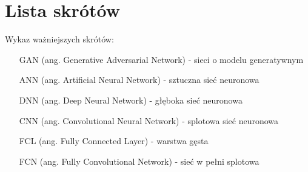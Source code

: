 \section*{Lista skrótów} %

  \bigskip
  Wykaz ważniejszych skrótów:

    \begin{itemize}
      \item[GAN] (ang. Generative Adversarial Network) - sieci o modelu generatywnym
      \item[ANN] (ang. Artificial Neural Network) - sztuczna sieć neuronowa
      \item[DNN] (ang. Deep Neural Network) - głęboka sieć neuronowa
      \item[CNN] (ang. Convolutional Neural Network) - splotowa sieć neuronowa
      \item[FCL] (ang. Fully Connected Layer) - warstwa gęsta
      \item[FCN] (ang. Fully Convolutional Network) - sieć w pełni splotowa
    \end{itemize}

